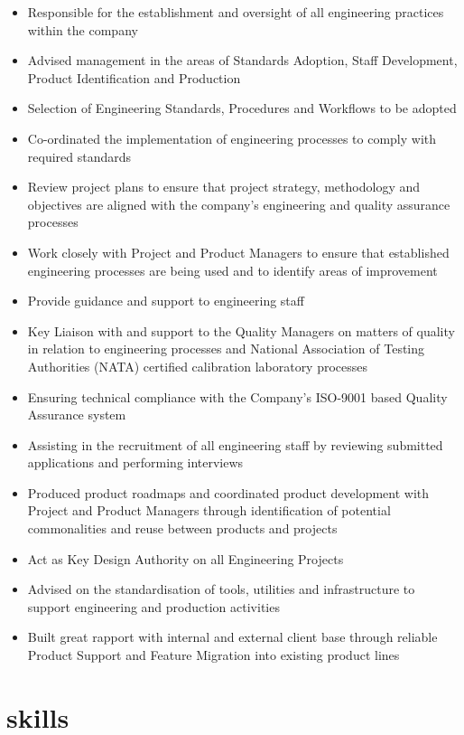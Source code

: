 \documentclass[]{friggeri-cv} %
\begin{document}
\begin{itemize}
    \item Responsible for the establishment and oversight of all engineering practices within the company
    \item Advised management in the areas of Standards Adoption, Staff Development, Product Identification and Production
    \item Selection of Engineering Standards, Procedures and Workflows to be adopted
    \item Co-ordinated the implementation of engineering processes to comply with required standards
    \item Review project plans to ensure that project strategy, methodology and objectives are aligned with the company’s engineering and quality assurance processes
    \item Work closely with Project and Product Managers to ensure that established engineering processes are being used and to identify areas of improvement
    \item Provide guidance and support to engineering staff
    \item Key Liaison with and support to the Quality Managers on matters of quality in relation to engineering processes and National Association of Testing Authorities (NATA) certified calibration laboratory processes
    \item Ensuring technical compliance with the Company’s ISO-9001 based Quality Assurance system
    \item Assisting in the recruitment of all engineering staff by reviewing submitted applications and performing interviews
    \item Produced product roadmaps and coordinated product development with Project and Product Managers through identification of potential commonalities and reuse between products and projects
    \item Act as Key Design Authority on all Engineering Projects
    \item Advised on the standardisation of tools, utilities and infrastructure to support engineering and production activities
    \item Built great rapport with internal and external client base through reliable Product Support and Feature Migration into existing product lines
\end{itemize}

\section{skills}
\end{document}
